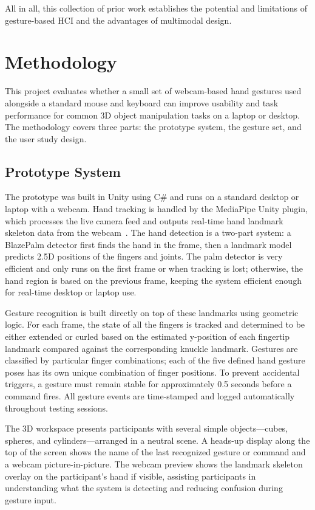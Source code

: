 \documentclass[manuscript]{acmart}
\begin{document}
All in all, this collection of prior work establishes the potential and limitations of gesture-based HCI and the advantages of multimodal design.

\section{Methodology}

This project evaluates whether a small set of webcam-based hand gestures used alongside a standard mouse and keyboard can improve usability and task performance for common 3D object manipulation tasks on a laptop or desktop. The methodology covers three parts: the prototype system, the gesture set, and the user study design.

\subsection{Prototype System}

The prototype was built in Unity using C\# and runs on a standard desktop or laptop with a webcam. Hand tracking is handled by the MediaPipe Unity plugin, which processes the live camera feed and outputs real-time hand landmark skeleton data from the webcam~\cite{zhang2020}. The hand detection is a two-part system: a BlazePalm detector first finds the hand in the frame, then a landmark model predicts 2.5D positions of the fingers and joints. The palm detector is very efficient and only runs on the first frame or when tracking is lost; otherwise, the hand region is based on the previous frame, keeping the system efficient enough for real-time desktop or laptop use.

Gesture recognition is built directly on top of these landmarks using geometric logic. For each frame, the state of all the fingers is tracked and determined to be either extended or curled based on the estimated y-position of each fingertip landmark compared against the corresponding knuckle landmark. Gestures are classified by particular finger combinations; each of the five defined hand gesture poses has its own unique combination of finger positions. To prevent accidental triggers, a gesture must remain stable for approximately 0.5 seconds before a command fires. All gesture events are time-stamped and logged automatically throughout testing sessions.

The 3D workspace presents participants with several simple objects—cubes, spheres, and cylinders—arranged in a neutral scene. A heads-up display along the top of the screen shows the name of the last recognized gesture or command and a webcam picture-in-picture. The webcam preview shows the landmark skeleton overlay on the participant's hand if visible, assisting participants in understanding what the system is detecting and reducing confusion during gesture input.
\end{document}

